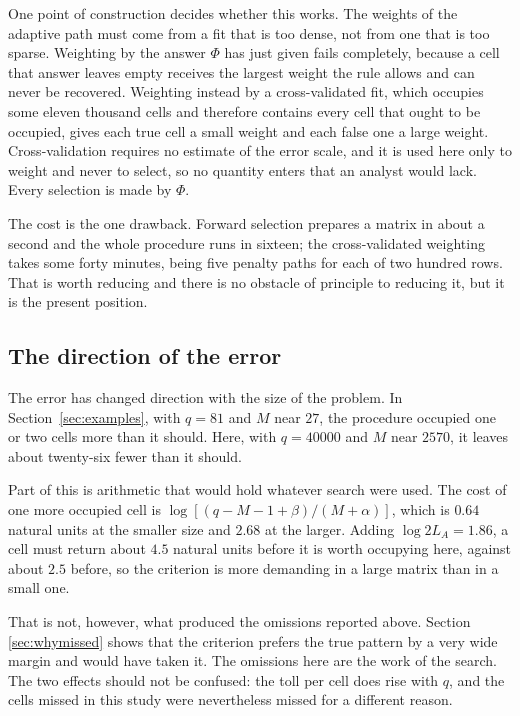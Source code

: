 One point of construction decides whether this works. The weights of the adaptive
path must come from a fit that is too dense, not from one that is too sparse.
Weighting by the answer $\Phi$ has just given fails completely, because a cell that
answer leaves empty receives the largest weight the rule allows and can never be
recovered. Weighting instead by a cross-validated fit, which occupies some eleven
thousand cells and therefore contains every cell that ought to be occupied, gives
each true cell a small weight and each false one a large weight. Cross-validation
requires no estimate of the error scale, and it is used here only to weight and never
to select, so no quantity enters that an analyst would lack. Every selection is made
by $\Phi$.

The cost is the one drawback. Forward selection prepares a matrix in about a second
and the whole procedure runs in sixteen; the cross-validated weighting takes some
forty minutes, being five penalty paths for each of two hundred rows. That is worth
reducing and there is no obstacle of principle to reducing it, but it is the present
position.

\subsection{The direction of the error}

The error has changed direction with the size of the problem. In
Section~\ref{sec:examples}, with $q = 81$ and $M$ near $27$, the procedure occupied
one or two cells more than it should. Here, with $q = 40000$ and $M$ near $2570$, it
leaves about twenty-six fewer than it should.

Part of this is arithmetic that would hold whatever search were used. The cost of one
more occupied cell is $\log \left[ (q-M-1+\beta) / (M+\alpha) \right]$, which is
$0.64$ natural units at the smaller size and $2.68$ at the larger. Adding
$\log 2 L_{A} = 1.86$, a cell must return about $4.5$ natural units before it is
worth occupying here, against about $2.5$ before, so the criterion is more demanding
in a large matrix than in a small one.

That is not, however, what produced the omissions reported above. Section
\ref{sec:whymissed} shows that the criterion prefers the true pattern by a very wide
margin and would have taken it. The omissions here are the work of the search. The
two effects should not be confused: the toll per cell does rise with $q$, and the
cells missed in this study were nevertheless missed for a different reason.

